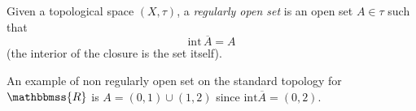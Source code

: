 \documentclass[12pt]{article}
\newcommand{\R}{\mathbbmss{R}}
\begin{document}
Given a topological space $(X,\tau)$, a \emph{regularly open set} is an open set $A\in \tau$ such that 
$$\mathrm{int}\, \overline{A}=A$$
(the interior of the closure is the set itself).

An example of non regularly open set on the standard topology for $\R$ is
$A=(0,1)\cup(1,2)$ since $\mathrm{int}\overline{A}=(0,2)$.
\end{document}
